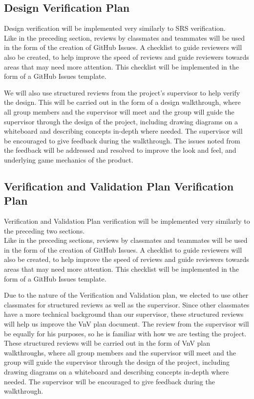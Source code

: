 \documentclass[12pt, titlepage]{article}
\begin{document}
\subsection{Design Verification Plan}

Design verification will be implemented very similarly to SRS verification. \\
Like in the preceding section, reviews by classmates and teammates will be used in the form of the creation of GitHub Issues. A checklist to guide reviewers will also be created, to help improve the speed of reviews and guide reviewers towards areas that may need more attention. This checklist will be implemented in the form of a GitHub Issues template.

We will also use structured reviews from the project's supervisor to help verify the design. This will be carried out in the form of a design walkthrough, where all group members and the supervisor will meet and the group will guide the supervisor through the design of the project, including drawing diagrams on a whiteboard and describing concepts in-depth where needed. The supervisor will be encouraged to give feedback during the walkthrough. The issues noted from the feedback will be addressed and resolved to improve the look and feel, and underlying game mechanics of the product.

\subsection{Verification and Validation Plan Verification Plan}

Verification and Validation Plan verification will be implemented very similarly to the preceding two sections. \\
Like in the preceding sections, reviews by classmates and teammates will be used in the form of the creation of GitHub Issues. A checklist to guide reviewers will also be created, to help improve the speed of reviews and guide reviewers towards areas that may need more attention. This checklist will be implemented in the form of a GitHub Issues template.

Due to the nature of the Verification and Validation plan, we elected to use other classmates for structured reviews as well as the supervisor. Since other classmates have a more technical background than our supervisor, these structured reviews will help us improve the VnV plan document. The review from the supervisor will be equally for his purposes, so he is familiar with how we are testing the project. These structured reviews will be carried out in the form of VnV plan walkthroughs, where all group members and the supervisor will meet and the group will guide the supervisor through the design of the project, including drawing diagrams on a whiteboard and describing concepts in-depth where needed. The supervisor will be encouraged to give feedback during the walkthrough. 
\end{document}
